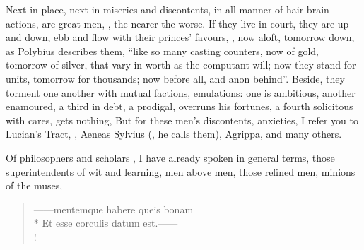
Next in place, next in miseries and discontents, in all manner of hair-brain
actions, are great men, , the nearer the
worse. If they live in court, they are up and down, ebb and flow with their
princes' favours, , now aloft, tomorrow
down, as Polybius describes them, \enquote{like so many casting
counters, now of gold, tomorrow of silver, that vary in worth as the computant
will; now they stand for units, tomorrow for thousands; now before all, and
anon behind}. Beside, they torment one another with mutual factions,
emulations: one is ambitious, another enamoured, a third in debt, a prodigal,
overruns his fortunes, a fourth solicitous with cares, gets nothing, \etc{} But
for these men's discontents, anxieties, I refer you to Lucian's Tract, , Aeneas Sylvius (, he calls them), Agrippa, and many others.

Of philosophers and scholars , I have already
spoken in general terms, those superintendents of wit and learning, men above
men, those refined men, minions of the muses,

\begin{latin}
\begin{verse}%
------mentemque habere queis bonam\\*
Et esse corculis datum est.------\\!
\end{verse}%
\end{latin}

